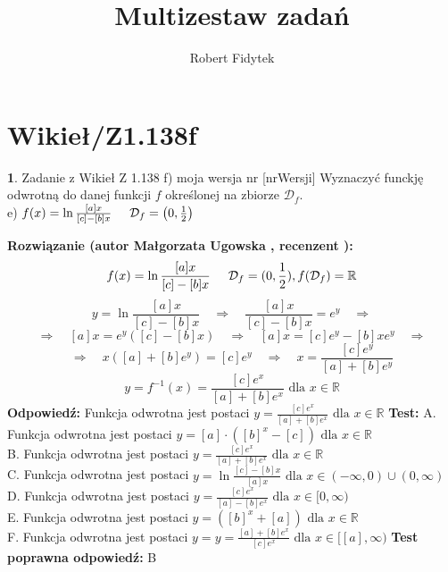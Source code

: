 \documentclass[12pt, a4paper]{article}
\title{Multizestaw zadań}
\author{Robert Fidytek}
\date{}
\theoremstyle{definition} %
\newtheorem{zad}{}
\newcommand{\kategoria}[1]{\section{#1}} %
\newcommand{\zadStart}[1]{\begin{zad}#1\newline} %
\newcommand{\zadStop}{\end{zad}}   %
\newcommand{\rozwStart}[2]{\noindent \textbf{Rozwiązanie (autor #1 , recenzent #2): }\newline} %
\newcommand{\rozwStop}{\newline}                                            %
\newcommand{\odpStart}{\noindent \textbf{Odpowiedź:}\newline}    %
\newcommand{\odpStop}{\newline}                                             %
\newcommand{\testStart}{\noindent \textbf{Test:}\newline} %
\newcommand{\testStop}{\newline} %
\newcommand{\kluczStart}{\noindent \textbf{Test poprawna odpowiedź:}\newline} %
\newcommand{\kluczStop}{\newline} %
\begin{document}
\maketitle


\kategoria{Wikieł/Z1.138f}
\zadStart{Zadanie z Wikieł Z 1.138 f) moja wersja nr [nrWersji]}
Wyznaczyć funckję odwrotną do danej funkcji $f$ określonej na zbiorze $\mathcal{D}_{f}$.\\
e) $f(x)=\ln{\frac{[a]x}{[c]-[b]x}}\hspace{5mm}\mathcal{D}_{f}=\big(0, \frac{1}{2}\big)$
\zadStop
\rozwStart{Małgorzata Ugowska}{}
$$f(x)=\ln{\frac{[a]x}{[c]-[b]x}}\hspace{5mm} \mathcal{D}_{f}=(0, \frac{1}{2}), f(\mathcal{D}_{f})=\mathbb{R}$$
$$y=\ln{\frac{[a]x}{[c]-[b]x}}\quad \Rightarrow \quad \frac{[a]x}{[c]-[b]x}=e^y \quad \Rightarrow $$
$$\Rightarrow \quad [a]x= e^y([c]-[b]x) \quad \Rightarrow \quad [a]x= [c] e^y-[b]x e^y \quad \Rightarrow$$
$$\Rightarrow \quad x([a]+[b]e^y)=[c]e^y \quad \Rightarrow \quad x = \frac{[c]e^y}{[a]+[b]e^y}$$
$$y=f^{-1}(x)=\frac{[c]e^x}{[a]+[b]e^x} \mbox{ dla } x\in \mathbb{R}$$
\rozwStop
\odpStart
Funkcja odwrotna jest postaci $y=\frac{[c]e^x}{[a]+[b]e^x} \mbox{ dla }x\in \mathbb{R}$
\odpStop
\testStart
A. Funkcja odwrotna jest postaci $y=[a]\cdot([b]^{x}-[c])  \mbox{ dla }x\in\mathbb{R}$\\
B. Funkcja odwrotna jest postaci $y=\frac{[c]e^x}{[a]+[b]e^x} \mbox{ dla }x\in\mathbb{R}$\\
C. Funkcja odwrotna jest postaci $y=\ln{\frac{[c]-[b]x}{[a]x}}  \mbox{ dla }x\in(-\infty,0) \cup (0, \infty)$\\
D. Funkcja odwrotna jest postaci $y=\frac{[c]e^x}{[a]-[b]e^x} \mbox{ dla }x\in[0,\infty)$\\
E. Funkcja odwrotna jest postaci $y=([b]^{x}+[a]) \mbox{ dla }x\in \mathbb{R}$\\
F. Funkcja odwrotna jest postaci $y=y=\frac{[a]+[b]e^x}{[c]e^x}\mbox{ dla }x\in[[a],\infty)$
\testStop
\kluczStart
B
\kluczStop
\end{document}
